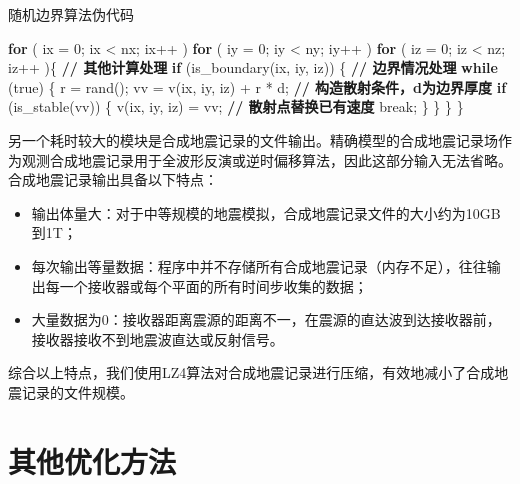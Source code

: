 \begin{algorithm}[ht]
\small
\caption{随机边界算法伪代码}\label{alg:randomboundary}
\begin{algorithmic}[1]
\State \textbf{for} ( ix = 0; ix < nx; ix++ )
\State \quad\quad \textbf{for} ( iy = 0; iy < ny; iy++ )
\State \quad\quad\quad\quad \textbf{for} ( iz = 0; iz < nz; iz++ )\{
\State \quad\quad\quad\quad\quad\quad \textbf{// 其他计算处理}
\State \quad\quad\quad\quad\quad\quad \textbf{if} (is\_boundary(ix, iy, iz)) \{ \textbf{// 边界情况处理}
\State \quad\quad\quad\quad\quad\quad\quad\quad \textbf{while} (true) \{ \label{ln:randbegin}
\State \quad\quad\quad\quad\quad\quad\quad\quad\quad\quad r = rand();
\State \quad\quad\quad\quad\quad\quad\quad\quad\quad\quad vv = v(ix, iy, iz) + r * d; \textbf{// 构造散射条件，d为边界厚度}
\State \quad\quad\quad\quad\quad\quad\quad\quad\quad\quad \textbf{if} (is\_stable(vv)) \{
\State \quad\quad\quad\quad\quad\quad\quad\quad\quad\quad\quad\quad v(ix, iy, iz) = vv; \textbf{// 散射点替换已有速度}
\State \quad\quad\quad\quad\quad\quad\quad\quad\quad\quad\quad\quad break;
\State \quad\quad\quad\quad\quad\quad\quad\quad\quad\quad \}
\State \quad\quad\quad\quad\quad\quad\quad\quad \} \label{ln:randend}
\State \quad\quad\quad\quad\quad\quad \}
\State \quad\quad\quad\quad \}
\end{algorithmic}
\end{algorithm}

另一个耗时较大的模块是合成地震记录的文件输出。精确模型的合成地震记录场作为观测合成地震记录用于全波形反演或逆时偏移算法，因此这部分输入无法省略。合成地震记录输出具备以下特点：
\begin{itemize}
  \item 输出体量大：对于中等规模的地震模拟，合成地震记录文件的大小约为10GB到1T；
  \item 每次输出等量数据：程序中并不存储所有合成地震记录（内存不足），往往输出每一个接收器或每个平面的所有时间步收集的数据；
  \item 大量数据为0：接收器距离震源的距离不一，在震源的直达波到达接收器前，接收器接收不到地震波直达或反射信号。
\end{itemize}
综合以上特点，我们使用LZ4算法对合成地震记录进行压缩，有效地减小了合成地震记录的文件规模。


\section{其他优化方法} %
\label{sec:其他优化方法}



